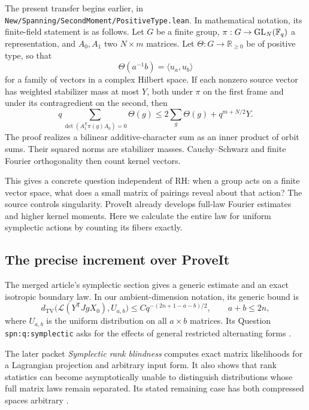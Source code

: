 The present transfer begins earlier, in
\texttt{New/Spanning/SecondMoment/PositiveType.lean}. In mathematical notation, its finite-field statement is as follows. Let $G$ be a finite group, $\pi:G\to\operatorname{GL}_N(\mathbb F_q)$ a representation, and $A_0,A_1$ two $N\times m$ matrices. Let $\Theta:G\to\mathbb R_{\ge0}$ be of positive type, so that
\[
 \Theta(a^{-1}b)=\langle u_a,u_b\rangle
\]
for a family of vectors in a complex Hilbert space. If each nonzero source vector has weighted stabilizer mass at most $Y$, both under $\pi$ on the first frame and under its contragredient on the second, then
\begin{equation}\label{eq:source-bound}
 q\sum_{\det(A_1^{\mathsf T}\pi(g)A_0)=0}\Theta(g)
 \le 2\sum_g\Theta(g)+q^{m+N/2}Y.
\end{equation}
The proof realizes a bilinear additive-character sum as an inner product of orbit sums. Their squared norms are stabilizer masses. Cauchy--Schwarz and finite Fourier orthogonality then count kernel vectors.

This gives a concrete question independent of RH: when a group acts on a finite vector space, what does a small matrix of pairings reveal about that action? The source controls singularity. ProveIt already develops full-law Fourier estimates and higher kernel moments. Here we calculate the entire law for uniform symplectic actions by counting its fibers exactly.

\subsection{The precise increment over ProveIt}

The merged article's symplectic section gives a generic estimate and an exact isotropic boundary law. In our ambient-dimension notation, its generic bound is
\[
 d_{\mathrm{TV}}\bigl(\mathcal L(Y^{\mathsf T}JgX_0),U_{a,b}\bigr)
 \le Cq^{-(2n+1-a-b)/2},\qquad a+b\le2n,
\]
where $U_{a,b}$ is the uniform distribution on all $a\times b$ matrices. Its Question \texttt{spn:q:symplectic} asks for the effects of general restricted alternating forms \cite{proveit}.

The later packet \emph{Symplectic rank blindness} computes exact matrix likelihoods for a Lagrangian projection and arbitrary input form. It also shows that rank statistics can become asymptotically unable to distinguish distributions whose full matrix laws remain separated. Its stated remaining case has both compressed spaces arbitrary \cite{rankblind}.

